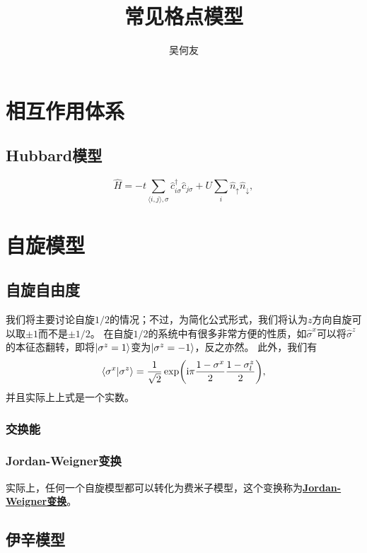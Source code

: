 \documentclass[hyperref, UTF8, a4paper]{ctexart}
\title{常见格点模型}
\author{吴何友}
\newcommand*{\ii}{\mathrm{i}}
\newcommand*{\pair}[1]{\langle #1 \rangle}
\newcommand*{\concept}[1]{\underline{\textbf{#1}}}
\begin{document}
\maketitle

\section{相互作用体系}

\subsection{Hubbard模型}

\begin{equation}
    \hat{H} = - t \sum_{\pair{i, j}, \sigma} \hat{c}^\dagger_{i \sigma} \hat{c}_{j \sigma} + U \sum_i \hat{n}_\uparrow \hat{n}_\downarrow,
\end{equation}

\section{自旋模型}

\subsection{自旋自由度}

我们将主要讨论自旋$1/2$的情况；不过，为简化公式形式，我们将认为$z$方向自旋可以取$\pm 1$而不是$\pm 1/2$。
在自旋$1/2$的系统中有很多非常方便的性质，如$\hat{\sigma}^x$可以将$\hat{\sigma}^z$的本征态翻转，即将$\ket{\sigma^z=1}$变为$\ket{\sigma^z=-1}$，反之亦然。
此外，我们有
\begin{equation}
    \braket{\sigma^x}{\sigma^z} = \frac{1}{\sqrt{2}} \exp(\ii \pi \frac{1 - \sigma^x}{2} \frac{1 - \sigma^z_l}{2}),
\end{equation}
并且实际上上式是一个实数。

\subsubsection{交换能}

\subsubsection{Jordan-Weigner变换}

实际上，任何一个自旋模型都可以转化为费米子模型，这个变换称为\concept{Jordan-Weigner变换}。

\subsection{伊辛模型}
\end{document}

